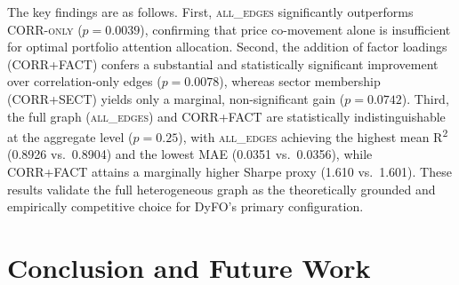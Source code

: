 \documentclass[runningheads]{llncs}
\begin{document}
The key findings are as follows. First, \textsc{all\_edges} significantly outperforms \textsc{CORR-only} ($p = 0.0039$), confirming that price co-movement alone is insufficient for optimal portfolio attention allocation. Second, the addition of factor loadings (\textsc{CORR+FACT}) confers a substantial and statistically significant improvement over correlation-only edges ($p = 0.0078$), whereas sector membership (\textsc{CORR+SECT}) yields only a marginal, non-significant gain ($p = 0.0742$). Third, the full graph (\textsc{all\_edges}) and \textsc{CORR+FACT} are statistically indistinguishable at the aggregate level ($p = 0.25$), with \textsc{all\_edges} achieving the highest mean R\textsuperscript{2} (0.8926 vs.\ 0.8904) and the lowest MAE (0.0351 vs.\ 0.0356), while \textsc{CORR+FACT} attains a marginally higher Sharpe proxy (1.610 vs.\ 1.601).
These results validate the full heterogeneous graph as the theoretically grounded and empirically competitive choice for DyFO's primary configuration.

\section{Conclusion and Future Work}\label{sec:conclusion}


\end{document}
